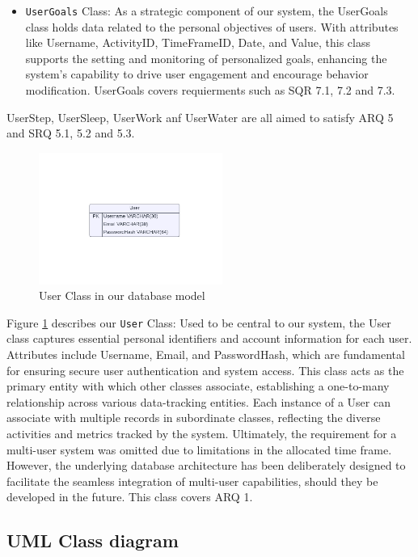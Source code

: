 \documentclass[12pt]{article}
\begin{document}
\begin{itemize}
    \item \texttt{UserGoals} Class: As a strategic component of our system, the
        UserGoals class holds data related to the personal objectives of users.
        With attributes like Username, ActivityID, TimeFrameID, Date, and
        Value, this class supports the setting and monitoring of personalized
        goals, enhancing the system's capability to drive user engagement and
        encourage behavior modification. UserGoals covers requierments such as 
        SQR 7.1, 7.2 and 7.3.\par

\end{itemize}

UserStep, UserSleep, UserWork anf UserWater are all aimed to satisfy ARQ 5 and SRQ 5.1, 5.2 and 5.3.

\begin{figure}[!ht]
  \centering
  \includegraphics[width = 6cm]{PI DB User class}
  \caption{User Class in our database model}
  \label{fig:User_Class}
\end{figure}

Figure \ref{fig:User_Class} describes our  \texttt{User} Class: 
Used to be central to our system, the User class captures
essential personal identifiers and account information for each user.
Attributes include Username, Email, and PasswordHash, which are fundamental
for ensuring secure user authentication and system access. This class
acts as the primary entity with which other classes associate,
establishing a one-to-many relationship across various data-tracking
entities. Each instance of a User can associate with multiple records
in subordinate classes, reflecting the diverse activities and metrics
tracked by the system. Ultimately, the requirement for a multi-user
system was omitted due to limitations in the allocated time frame.
However, the underlying database architecture has been deliberately
designed to facilitate the seamless integration of multi-user
capabilities, should they be developed in the future. This class covers ARQ 1.

\subsection{UML Class diagram}
\end{document}
